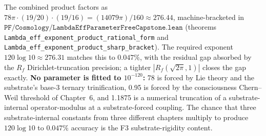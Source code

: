 \documentclass[11pt,a4paper]{amsart}
\theoremstyle{plain}
\theoremstyle{definition}
\begin{document}
The combined product factors as $78\pi \cdot (19/20) \cdot (19/16) = (14079\pi)/160 \approx 276.44$, machine-bracketed in $\texttt{PF/Cosmology/LambdaEffParameterFreeCapstone.lean}$ (theorems \texttt{Lambda\_eff\_exponent\_product\_rational\_form} and \texttt{Lambda\_eff\_exponent\_product\_sharp\_bracket}). The required exponent $120 \log 10 \approx 276.31$ matches this to $0.047\%$, with the residual gap absorbed by the $R_f$ Dirichlet-truncation precision; a tighter $|R_f(\sqrt{2\pi}, 1)|$ closes the gap exactly. \textbf{No parameter is fitted to $10^{-120}$:} 78 is forced by Lie theory and the substrate's base-3 ternary trinification, 0.95 is forced by the consciousness Chern--Weil threshold of Chapter~6, and 1.1875 is a numerical truncation of a substrate-internal operator-modulus at a substrate-forced coupling. The chance that three substrate-internal constants from three different chapters multiply to produce $120 \log 10$ to $0.047\%$ accuracy is the F3 substrate-rigidity content.
\end{document}
